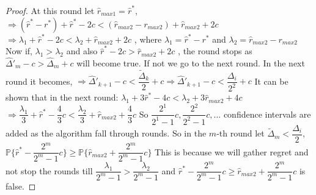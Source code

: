 \begin{proof}
\newline
At this round let $\hat{r}_{max1}=\hat{r}^{*}$, 
\newline
\hspace*{8em}$\Rightarrow (\hat{r}^{*}-r^{*}) + \hat{r}^{*} - 2c < (\hat{r}_{max2}-r_{max2}) + \hat{r}_{max2} + 2c$
\newline
\hspace*{8em}$\Rightarrow \lambda_{1} + \hat{r}^{*} - 2c < \lambda_{2} + \hat{r}_{max2} + 2c$ , where $\lambda_{1}=\hat{r}^{*}-r^{*}$ and $\lambda_{2}=\hat{r}_{max2}-r_{max2}$
\newline
\newline
Now if, $\lambda_{1} > \lambda_{2}$ and also $ \hat{r}^{*} - 2c > \hat{r}_{max2} + 2c$ , the round stops as $\hat{\Delta}'_{m} - c > \hat{\Delta}_{m} + c $ will become true. If not we go to the next round. In the next round it becomes, 
\newline
\hspace*{8em}$\Rightarrow \hat{\Delta}'_{k+1} - c < \dfrac{\tilde{\Delta}_{k}}{2} + c \Rightarrow \hat{\Delta}'_{k+1} - c < \dfrac{\Delta_{i}}{2^{2}} + c$
\newline
It can be shown that in the next round:
\newline
\hspace*{8em}$\lambda_{1} + 3\hat{r}^{*} - 4c < \lambda_{2} + 3\hat{r}_{max2} + 4c$
\newline
\hspace*{8em}$\Rightarrow \dfrac{\lambda_{1}}{3} + \hat{r}^{*} - \dfrac{4}{3}c < \dfrac{\lambda_{2}}{3} + \hat{r}_{max2} + \dfrac{4}{3}c$
\newline
So $\dfrac{2^{1}}{2^{1}-1}c,\dfrac{2^{2}}{2^{2}-1}c,...$ confidence intervals are added as the algorithm fall through rounds. So in the $m$-th round let $\tilde{\Delta}_{m}< \dfrac{\Delta_{i}}{2}$,
\newline
\hspace*{8em}$ \mathbb{P} \lbrace\hat{r}^{*} - \dfrac{2^{m}}{2^{m}-1}c\rbrace \geq \mathbb{P} \lbrace\hat{r}_{max2} + \dfrac{2^{m}}{2^{m}-1}c\rbrace$
\newline
This is because we will gather regret and not stop the rounds till $\dfrac{\lambda_{1}}{2^{m}-1} > \dfrac{\lambda_{2}}{2^{m}-1}$ and $\hat{r}^{*} - \dfrac{2^{m}}{2^{m}-1}c \geq  \hat{r}_{max2} + \dfrac{2^{m}}{2^{m}-1}c$ is false.

\end{proof}
